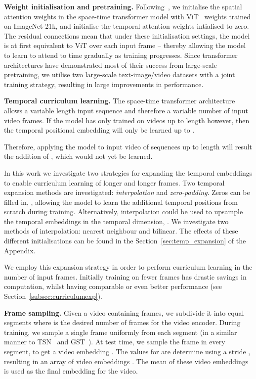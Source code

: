 \documentclass[10pt,twocolumn,letterpaper]{article}
\begin{document}
\noindent\textbf{Weight initialisation and pretraining.}
Following~\cite{bertasius2021spacetime}, we initialise the spatial attention weights in the space-time transformer model with ViT~\cite{dosovitskiy2021an} weights trained on ImageNet-21k, and initialise the temporal attention weights intialised to zero.
The residual connections mean that under these initialisation settings, the model is at first equivalent to ViT over each input frame -- thereby allowing the model to learn to attend to time gradually as training progresses. Since transformer architectures have demonstrated most of their success from large-scale pretraining, we utilise two large-scale text-image/video datasets with a joint training strategy, resulting in large improvements in performance.

\noindent\textbf{Temporal curriculum learning.} The space-time transformer architecture allows a variable length input sequence and therefore a variable number of input video frames. If the model has only trained on videos up to length  however, then the temporal positional embedding  will only be learned up to .

Therefore, applying the model to input video of sequences up to length  will result the addition of , which would not yet be learned.

In this work we investigate two strategies for expanding the temporal embeddings to enable curriculum learning of longer and longer frames. Two temporal expansion methods are investigated: \textit{interpolation} and \textit{zero-padding}. Zeros can be filled in, , allowing the model to learn the additional temporal positions from scratch during training. Alternatively, interpolation could be used to upsample the temporal embeddings in the temporal dimension, . We investigate two methods of interpolation: nearest neighbour and bilinear. The effects of these different initialisations can be found in the Section~\ref{sec:temp_expansion} of the Appendix.

We employ this expansion strategy in order to perform curriculum learning in the number of input frames. Initially training on fewer frames has drastic savings in computation, whilst having comparable or even better performance (see Section~\ref{subsec:curriculumexp}).

\noindent\textbf{Frame sampling.} Given a video containing  frames, we subdivide it into  equal segments where  is the desired number of frames for the video encoder. During training, we sample a single frame uniformly from each segment (in a similar manner to  TSN~\cite{wang_tsn} and GST~\cite{gst}).
At test time, we sample the  frame in every segment, to get a video embedding . The values for  are determine using a stride , resulting in an array of video embeddings . The mean of these video embeddings is used as the final embedding for the video.
\end{document}
